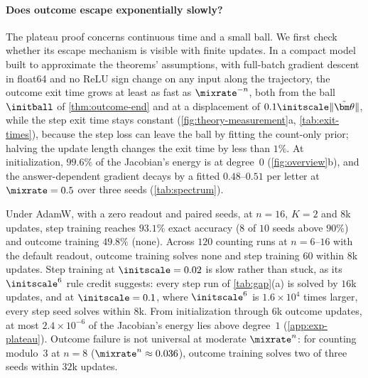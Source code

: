 \paragraph{Does outcome escape exponentially slowly?} The plateau proof concerns continuous time and a small ball. We first check
whether its escape mechanism is visible with finite updates. In a compact model built to approximate the theorems' assumptions, with full-batch gradient descent
in float64 and no ReLU sign change on any input along the trajectory, the outcome exit time grows at least as fast as $\mixrate^{-n}$, both from the
ball $\initball$ of \cref{thm:outcome-end} and at a displacement of $0.1\initscale\|\tilde{\bm\theta}\|$, while the step exit time stays
constant (\cref{fig:theory-measurement}a, \cref{tab:exit-times}), because the step loss can leave the ball by fitting the count-only prior;
halving the update length changes the exit time by less than $1\%$. At
initialization, $99.6\%$ of the Jacobian's energy is at degree~$0$ (\cref{fig:overview}b), and the answer-dependent
gradient decays by a fitted $0.48$--$0.51$ per letter at $\mixrate=0.5$ over three seeds (\cref{tab:spectrum}).

Under AdamW, with a zero readout and paired seeds, at $n=16$, $K=2$ and $8$k updates, step training reaches
$93.1\%$ exact accuracy ($8$ of $10$ seeds above $90\%$) and outcome training $49.8\%$ (none). Across $120$ counting runs at
$n=6$--$16$ with the default readout, outcome training solves none and step training $60$ within $8$k updates. Step
training at $\initscale=0.02$ is slow rather than stuck, as its $\initscale^6$ rule credit suggests: every step run of
\cref{tab:gap}(a) is solved by $16$k updates, and at $\initscale=0.1$, where $\initscale^6$ is $1.6\times10^4$ times larger, every
step seed solves within $8$k. From initialization through $6$k outcome updates, at most $2.4\times10^{-6}$ of the Jacobian's
energy lies above degree~$1$ (\cref{app:exp-plateau}). Outcome failure is not universal at moderate $\mixrate^n$: for counting
modulo~$3$ at $n=8$ ($\mixrate^n\approx0.036$), outcome training solves two of three seeds within $32$k updates.

